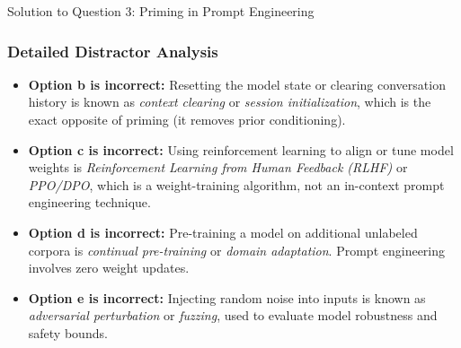 \documentclass[11pt,a4paper]{article}
\begin{document}
\begin{solutionbox}{Solution to Question 3: Priming in Prompt Engineering}
\subsubsection*{Detailed Distractor Analysis}
\begin{itemize}[leftmargin=1.5em]
    \item \textbf{Option b is incorrect:} Resetting the model state or clearing conversation history is known as \textit{context clearing} or \textit{session initialization}, which is the exact opposite of priming (it removes prior conditioning).
    \item \textbf{Option c is incorrect:} Using reinforcement learning to align or tune model weights is \textit{Reinforcement Learning from Human Feedback (RLHF)} or \textit{PPO/DPO}, which is a weight-training algorithm, not an in-context prompt engineering technique.
    \item \textbf{Option d is incorrect:} Pre-training a model on additional unlabeled corpora is \textit{continual pre-training} or \textit{domain adaptation}. Prompt engineering involves zero weight updates.
    \item \textbf{Option e is incorrect:} Injecting random noise into inputs is known as \textit{adversarial perturbation} or \textit{fuzzing}, used to evaluate model robustness and safety bounds.
\end{itemize}
\end{solutionbox}

\vspace{0.4cm}
\end{document}
